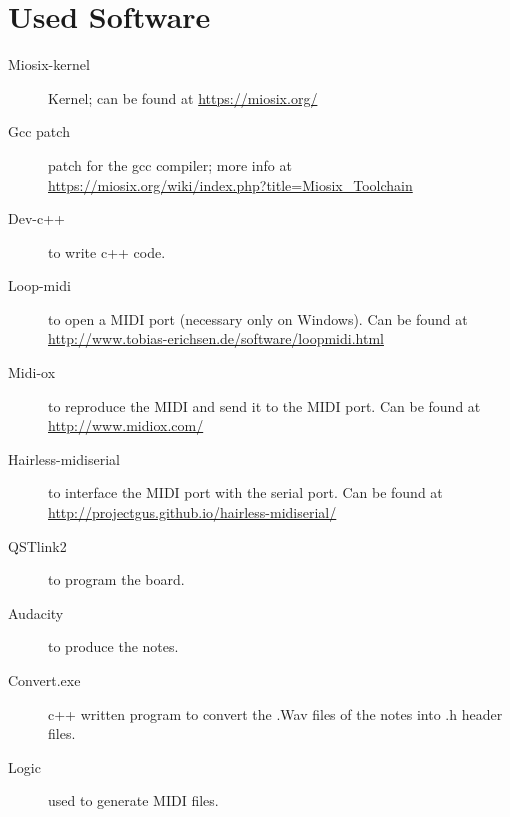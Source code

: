\documentclass[12pt]{article}
\begin{document}
\section{Used Software} \label{sec:used}
\begin{description} 
	\item[Miosix-kernel] Kernel; can be found at \url{https://miosix.org/}
	\item[Gcc patch] patch for the gcc compiler; more info at \url{https://miosix.org/wiki/index.php?title=Miosix_Toolchain}
	\item[Dev-c++] to write c++  code.
	\item[Loop-midi] to open a MIDI port (necessary only on Windows). Can be found at \url{http://www.tobias-erichsen.de/software/loopmidi.html}
	\item[Midi-ox] to reproduce the MIDI and send it to the MIDI port. Can be found at \url{http://www.midiox.com/}
	\item[Hairless-midiserial] to interface the MIDI port with the serial port. Can be found at \url{http://projectgus.github.io/hairless-midiserial/}
	\item[QSTlink2] to program the board.
	\item[Audacity] to produce the notes.
	\item[Convert.exe] c++ written program to convert the .Wav files  of the notes into .h header files.
	\item[Logic] used to generate MIDI files.
\end{description}
\end{document}
